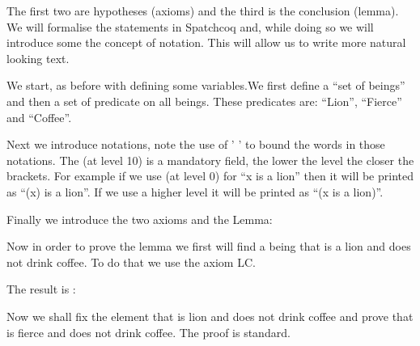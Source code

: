 The first two are hypotheses (axioms) and the third is the conclusion (lemma). We will formalise the statements in Spatchcoq and, while doing so we will introduce some the concept of notation. This will allow us to write more natural looking text.

We start, as before with defining some variables.We first define a ``set of beings'' and then a set of predicate on all beings. These predicates are: ``Lion'', ``Fierce'' and ``Coffee''. 




Next we introduce notations, note the use of ' ' to bound the words in those notations. The (at level 10) is a mandatory field, the lower the level the closer the brackets. For example if we use (at level 0) for ``x is a lion'' then it will be printed as ``(x) is a lion''. If we use a higher level it will be printed as ``(x is a lion)''.




Finally we introduce the two axioms and the Lemma:


Now in order to prove the lemma we first will find a being that is a lion and does not drink coffee. To do that we use the axiom LC.



The result is :


Now we shall fix the element that is lion and does not drink coffee and prove that is fierce and does not drink coffee. The proof is standard.



